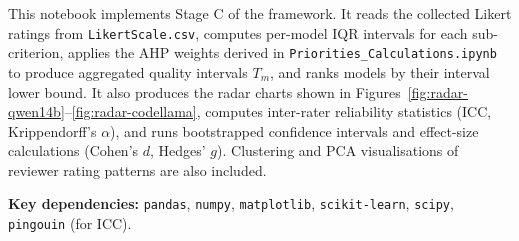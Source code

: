 This notebook implements Stage C of the framework. It reads the collected Likert
ratings from \texttt{LikertScale.csv}, computes per-model IQR intervals for each
sub-criterion, applies the AHP weights derived in
\texttt{Priorities\_Calculations.ipynb} to produce aggregated quality intervals $T_m$,
and ranks models by their interval lower bound. It also produces the radar charts
shown in Figures~\ref{fig:radar-qwen14b}--\ref{fig:radar-codellama}, computes
inter-rater reliability statistics (ICC, Krippendorff's $\alpha$), and runs
bootstrapped confidence intervals and effect-size calculations (Cohen's $d$,
Hedges' $g$). Clustering and PCA visualisations of reviewer rating patterns are
also included.

\textbf{Key dependencies:} \texttt{pandas}, \texttt{numpy}, \texttt{matplotlib},
\texttt{scikit-learn}, \texttt{scipy}, \texttt{pingouin} (for ICC).
